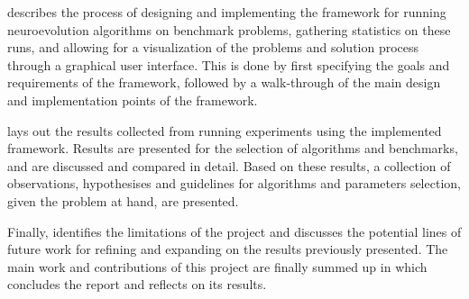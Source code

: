  describes the process of designing and implementing the framework for running neuroevolution algorithms on benchmark problems,
gathering statistics on these runs, and allowing for a visualization of the problems and solution process through a graphical user interface. This is done by first
specifying the goals and requirements of the framework, followed by a walk-through of the main design and implementation points of the framework.

 lays out the results collected from running experiments using the implemented framework.
Results are presented for the selection of algorithms and benchmarks, and are discussed and compared in detail. Based on these results, a collection of
observations, hypothesises and guidelines for algorithms and parameters selection, given the problem at hand, are presented.

Finally,  identifies the limitations of the project and discusses the potential lines of future work for refining and expanding on the results
previously presented. The main work and contributions of this project are finally summed up in  which concludes the report and reflects on its
results.
